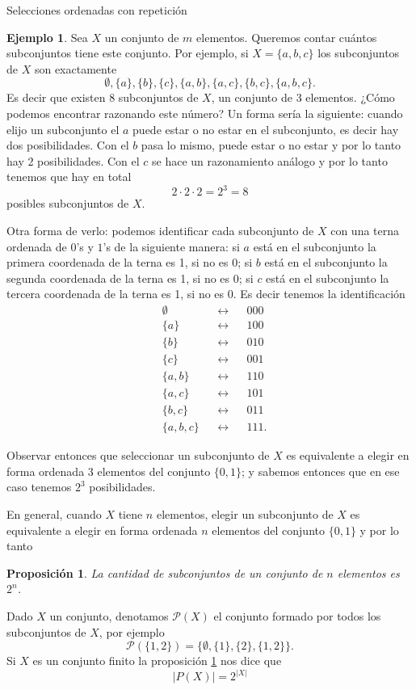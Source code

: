 \documentclass[11pt,spanish,makeidx]{amsbook}
\newtheorem{proposicion}[teorema]{Proposici\'on}
\theoremstyle{definition}
\newtheorem{ejemplo}{Ejemplo}[section]
\theoremstyle{remark}
\begin{document}
\begin{section}{Selecciones ordenadas con repetición}
 

\begin{ejemplo} Sea $X$ un conjunto de $m$ elementos. Queremos contar cuántos subconjuntos tiene este conjunto.  Por ejemplo, si $X = \{ a, b, c \}$ los subconjuntos de $X$ son exactamente
$$
\emptyset, \{ a \} , \{ b \}, \{ c \}, \{ a, b \}, \{ a, c \}, \{ b, c \}, \{ a, b, c\}.
$$ 
Es decir que existen 8 subconjuntos de $X$, un conjunto de 3 elementos. ¿Cómo podemos encontrar razonando este número? Un forma sería la siguiente:  cuando elijo un subconjunto el $a$ puede estar o no estar en el subconjunto, es decir hay dos posibilidades. Con el $b$ pasa lo mismo, puede estar o no estar y por lo tanto hay 2 posibilidades. Con el $c$ se hace un razonamiento análogo y por lo tanto tenemos que hay en total 
$$
2 \cdot 2 \cdot 2 = 2^3 = 8
$$
posibles subconjuntos de $X$.  

Otra forma de verlo: podemos identificar  cada subconjunto de  $X$ con una terna ordenada de $0$'s y $1$'s de la siguiente manera: si $a$ está en el subconjunto la primera coordenada de la terna es 1, si no es 0;  si $b$ está en el subconjunto la segunda coordenada de la terna es 1, si no es 0;  si $c$ está en el subconjunto la tercera coordenada de la terna es 1, si no es 0. Es decir tenemos la identificación
\begin{align*}
&\emptyset& &\leftrightarrow& &000 \\ 
&\{ a \} & &\leftrightarrow& &100 \\ 
&\{ b \}& &\leftrightarrow& &010 \\ 
&\{ c \}& &\leftrightarrow& &001 \\ 
&\{ a, b \}& &\leftrightarrow& &110 \\ 
&\{ a, c \}& &\leftrightarrow& &101 \\ 
&\{ b, c \}& &\leftrightarrow& &011 \\ 
&\{ a, b, c\}& &\leftrightarrow& &111 .
\end{align*}
 
Observar entonces que seleccionar un subconjunto de $X$ es equivalente a elegir en forma ordenada 3 elementos del conjunto $\{ 0, 1 \}$; y sabemos entonces que en ese caso tenemos $2^3$ posibilidades. 

En general, cuando $X$ tiene $n$ elementos,  elegir un subconjunto de $X$ es  equivalente a elegir en forma  ordenada $n$ elementos del conjunto $\{ 0, 1 \}$ y por lo tanto

\begin{proposicion}\label{cardp} La cantidad de subconjuntos de  
un conjunto de $n$ elementos es $2^n$.
\end{proposicion}

Dado  $X$ un conjunto, denotamos $\mathcal P(X)$ el  conjunto  formado por todos los subconjuntos de $X$, por ejemplo
$$
\mathcal P(\{1,2\}) = \{\emptyset,\{1\},\{2\},\{1,2\}\}.
$$  
Si $X$ es un conjunto finito la proposición \ref{cardp} nos dice que
$$
\mathcal |P(X)| = 2^{|X|}
$$
\end{ejemplo}

\end{section}
\end{document}
